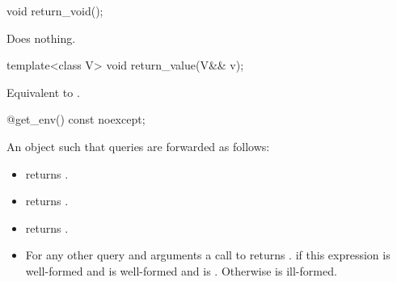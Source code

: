 %
\begin{itemdecl}
void return_void();
\end{itemdecl}
\begin{itemdescr}
\pnum
\effects
Does nothing.
\end{itemdescr}

%
\begin{itemdecl}
template<class V>
  void return_value(V&& v);
\end{itemdecl}
\begin{itemdescr}
\pnum
\effects
Equivalent to .
\end{itemdescr}

%
\begin{itemdecl}
@\unspec@ get_env() const noexcept;
\end{itemdecl}
\begin{itemdescr}
\pnum
\returns
An object  such that queries are forwarded as follows:
\begin{itemize}
\item {} returns .
\item {} returns .
\item {} returns
.
\item For any other query  and arguments  a
call to  returns
.  if this expression
is well-formed and  is well-formed and is .
Otherwise  is ill-formed.
\end{itemize}
\end{itemdescr}


